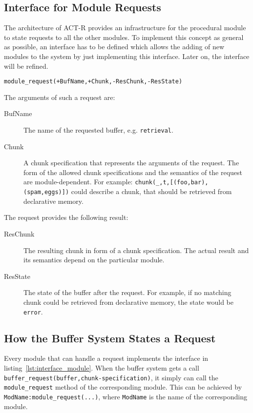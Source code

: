 \subsection{Interface for Module Requests}
\label{interface_for_module_requests}

The architecture of ACT-R provides an infrastructure for the procedural module to state requests to all the other modules. To implement this concept as general as possible, an interface has to be defined which allows the adding of new modules to the system by just implementing this interface. Later on, the interface will be refined.

\begin{lstlisting}[caption={Simple Interface \emph{IModule}},label=lst:interface_module]
module_request(+BufName,+Chunk,-ResChunk,-ResState)
\end{lstlisting}

The arguments of such a request are:

\begin{description}
 \item[BufName] The name of the requested buffer, e.g. \lstinline|retrieval|.
 \item[Chunk] A chunk specification that represents the arguments of the request. The form of the allowed chunk specifications and the semantics of the request are module-dependent. For example: \lstinline|chunk(_,t,[(foo,bar),(spam,eggs)])| could describe a chunk, that should be retrieved from declarative memory.
\end{description}

The request provides the following result:

\begin{description}
 \item[ResChunk] The resulting chunk in form of a chunk specification. The actual result and its semantics depend on the particular module.
 \item[ResState] The state of the buffer after the request. For example, if no matching chunk could be retrieved from declarative memory, the state would be \lstinline|error|.
\end{description}

\subsection{How the Buffer System States a Request}
\label{how_the_buffer_system_states_a_request}

Every module that can handle a request implements the interface in listing~\ref{lst:interface_module}. When the buffer system gets a call \lstinline|buffer_request(buffer,chunk-specification)|, it simply can call the \lstinline|module_request| method of the corresponding module. This can be achieved by \lstinline|ModName:module_request(...)|, where \lstinline|ModName| is the name of the corresponding module.

